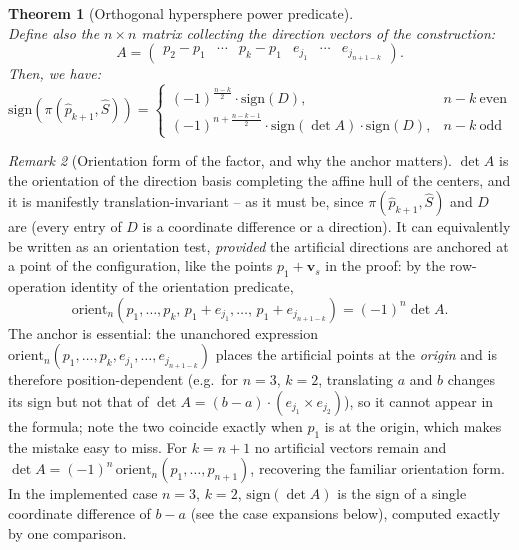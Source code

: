 \documentclass[12pt]{article}
\newtheorem{theorem}{Theorem}
\theoremstyle{definition}
\theoremstyle{remark}
\newtheorem{remark}[theorem]{Remark}
\begin{document}
\begin{theorem}[Orthogonal hypersphere power predicate]
\begin{equation*}
\end{equation*}
Define also the $n \times n$ matrix collecting the direction vectors of the construction:
\begin{equation*}
    A = \left( \begin{array}{c|c|c|c|c|c}
        p_2 - p_1 & \cdots & p_k - p_1 & e_{j_1} & \cdots & e_{j_{n+1-k}}
    \end{array} \right).
\end{equation*}
Then, we have:
\begin{equation*}
\mathrm{sign}(\pi(\hat p_{k+1}, \hat S)) =
\begin{cases}
    (-1)^{\frac{n-k}{2}} \cdot \mathrm{sign}(D), &n-k \ \text{even} \\
    (-1)^{n+\frac{n-k-1}{2}}
    \cdot\mathrm{sign}(\det A) \cdot \mathrm{sign}(D), & n-k \ \text{odd}
\end{cases}
\end{equation*}
\end{theorem}

\begin{remark}[Orientation form of the factor, and why the anchor matters]
$\det A$ is the orientation of the direction basis completing the affine hull
of the centers, and it is manifestly translation-invariant -- as it must be,
since $\pi(\hat p_{k+1}, \hat S)$ and $D$ are (every entry of $D$ is a
coordinate difference or a direction). It can equivalently be written as an
orientation test, \emph{provided} the artificial directions are anchored at a
point of the configuration, like the points $p_1 + \mathbf{v}_s$ in the proof:
by the row-operation identity of the orientation predicate,
\begin{equation*}
    \mathrm{orient}_n(p_1,\ldots,p_k,\,p_1+e_{j_1},\ldots,\,p_1+e_{j_{n+1-k}})
    = (-1)^n \det A .
\end{equation*}
The anchor is essential: the unanchored expression
$\mathrm{orient}_n(p_1,\ldots,p_k,e_{j_1},\ldots,e_{j_{n+1-k}})$ places the
artificial points at the \emph{origin} and is therefore position-dependent
(e.g.\ for $n=3$, $k=2$, translating $a$ and $b$ changes its sign but not that
of $\det A = (b-a)\cdot(e_{j_1}\times e_{j_2})$), so it cannot appear in the
formula; note the two coincide exactly when $p_1$ is at the origin, which makes
the mistake easy to miss. For $k = n+1$ no artificial vectors remain and
$\det A = (-1)^n\,\mathrm{orient}_n(p_1,\ldots,p_{n+1})$, recovering the
familiar orientation form. In the implemented case $n=3$, $k=2$,
$\mathrm{sign}(\det A)$ is the sign of a single coordinate difference of
$b-a$ (see the case expansions below), computed exactly by one comparison.
\end{remark}
\end{document}
